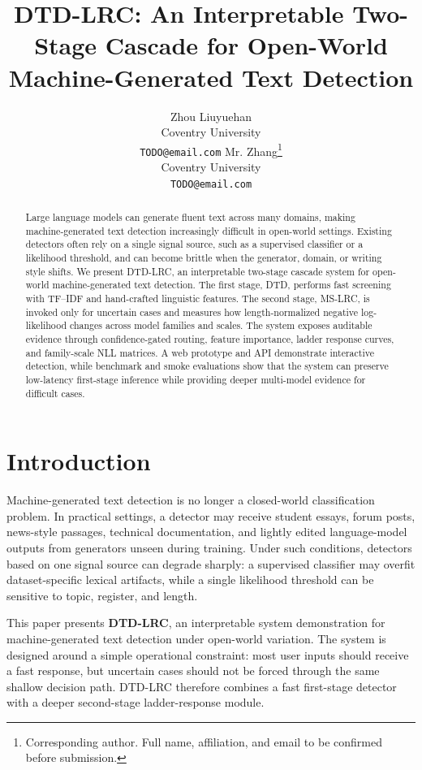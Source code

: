 \documentclass[11pt]{article}
\title{DTD-LRC: An Interpretable Two-Stage Cascade for Open-World Machine-Generated Text Detection}
\author{
Zhou Liuyuehan \\
Coventry University \\
\texttt{TODO@email.com}
\And
Mr. Zhang\thanks{Corresponding author. Full name, affiliation, and email to be confirmed before submission.} \\
Coventry University \\
\texttt{TODO@email.com}
}
\begin{document}
\maketitle

\begin{abstract}
Large language models can generate fluent text across many domains, making machine-generated text detection increasingly difficult in open-world settings. Existing detectors often rely on a single signal source, such as a supervised classifier or a likelihood threshold, and can become brittle when the generator, domain, or writing style shifts. We present DTD-LRC, an interpretable two-stage cascade system for open-world machine-generated text detection. The first stage, DTD, performs fast screening with TF--IDF and hand-crafted linguistic features. The second stage, MS-LRC, is invoked only for uncertain cases and measures how length-normalized negative log-likelihood changes across model families and scales. The system exposes auditable evidence through confidence-gated routing, feature importance, ladder response curves, and family-scale NLL matrices. A web prototype and API demonstrate interactive detection, while benchmark and smoke evaluations show that the system can preserve low-latency first-stage inference while providing deeper multi-model evidence for difficult cases.
\end{abstract}

\section{Introduction}

Machine-generated text detection is no longer a closed-world classification problem. In practical settings, a detector may receive student essays, forum posts, news-style passages, technical documentation, and lightly edited language-model outputs from generators unseen during training. Under such conditions, detectors based on one signal source can degrade sharply: a supervised classifier may overfit dataset-specific lexical artifacts, while a single likelihood threshold can be sensitive to topic, register, and length.

This paper presents \textbf{DTD-LRC}, an interpretable system demonstration for machine-generated text detection under open-world variation. The system is designed around a simple operational constraint: most user inputs should receive a fast response, but uncertain cases should not be forced through the same shallow decision path. DTD-LRC therefore combines a fast first-stage detector with a deeper second-stage ladder-response module.
\end{document}
